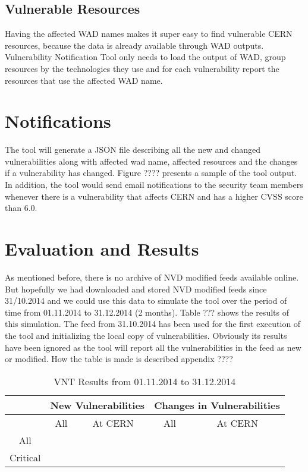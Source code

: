 {{\subsection{Vulnerable Resources}
Having the affected WAD names makes it super easy to find vulnerable CERN resources, because the data is already available through WAD outputs. Vulnerability Notification Tool only needs to load the output of WAD, group resources by the technologies they use and for each vulnerability report the resources that use the affected WAD name. 
\section{Notifications}
The tool will generate a JSON file describing all the new and changed vulnerabilities along with affected wad name, affected resources and the changes if a vulnerability has changed. Figure ???? presents a sample of the tool output. 
In addition, the tool would send email notifications to the security team members whenever there is a vulnerability that affects CERN and has a higher CVSS score than 6.0. 


\section{Evaluation and Results}

As mentioned before, there is no archive of NVD modified feeds available online. But hopefully we had downloaded and stored NVD modified feeds since 31/10.2014 and we could use this data to simulate the tool over the period of time from 01.11.2014 to 31.12.2014 (2 months). Table ??? shows the results of this simulation. The feed from 31.10.2014 has been used for the first execution of the tool and initializing the local copy of vulnerabilities. Obviously its results have been ignored as the tool will report all the vulnerabilities in the feed as new or modified. How the table is made is described appendix ????



\begin{table}
\begin{center}
    \begin{tabular}{ | c || c | c || c | c |}
    
    \hline
	 
     &  \multicolumn{2}{c||}{New Vulnerabilities} &  \multicolumn{2}{c|}{Changes in Vulnerabilities}  
    \\ \hline
      &  All &  At CERN &  All &  At CERN
    \\ \hline
       All &   &   &   &  
    \\ \hline
Critical &   &   &   &    
    \\ \hline
    \end{tabular}
    \caption{VNT Results from 01.11.2014 to 31.12.2014}
    \label{table:vnt_results}
   \end{center}
    \end{table}





}}
